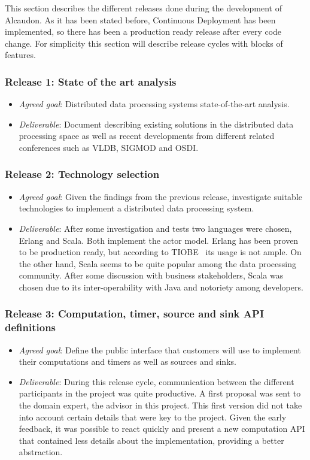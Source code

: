 This section describes the different releases done during the development of
Alcaudon. As it has been stated before, Continuous Deployment has been
implemented, so there has been a production ready release after every code
change. For simplicity this section will describe release cycles with blocks of
features.

\subsubsection{Release 1: State of the art analysis}
\begin{itemize}
\item \textit{Agreed goal}: Distributed data processing systems state-of-the-art analysis.
  \item \textit{Deliverable}: Document describing existing solutions in the
    distributed data processing space as well as recent developments from
    different related conferences such as VLDB, SIGMOD and OSDI.
\end{itemize}

\subsubsection{Release 2: Technology selection}
\begin{itemize}
\item \textit{Agreed goal}: Given the findings from the previous release,
  investigate suitable technologies to implement a distributed data processing
  system.
\item \textit{Deliverable}: After some investigation and tests two languages
  were chosen, Erlang and Scala. Both implement the actor model. Erlang has been
  proven to be production ready, but according to TIOBE~\cite{tiobe} its usage is
  not ample. On the other hand, Scala seems to be quite popular among the data
  processing community. After some discussion with business stakeholders, Scala
  was chosen due to its inter-operability with Java and notoriety among
  developers.
\end{itemize}

\subsubsection{Release 3: Computation, timer, source and sink API definitions}
\begin{itemize}
\item \textit{Agreed goal}: Define the public interface that customers will use
  to implement their computations and timers as well as sources and sinks.
\item \textit{Deliverable}: During this release cycle, communication between the
  different participants in the project was quite productive. A first proposal
  was sent to the domain expert, the advisor in this project. This first version
  did not take into account certain details that were key to the project. Given
  the early feedback, it was possible to react quickly and present a new
  computation API that contained less details about the implementation,
  providing a better abstraction.
\end{itemize}

